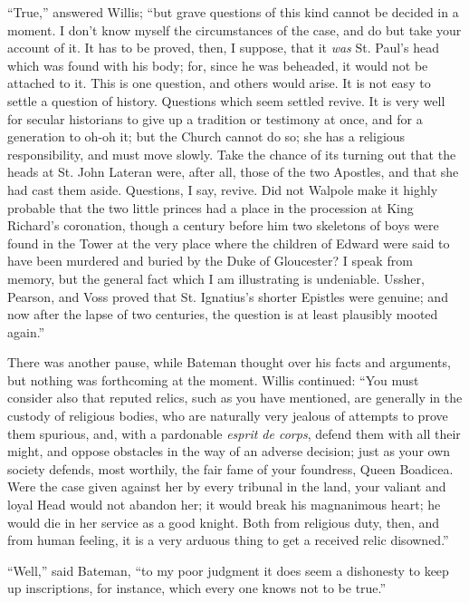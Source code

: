``True,'' answered Willis; ``but grave questions of
this kind cannot be decided in a moment. I don't know myself the
circumstances of the case, and do but take your account of it. It has
to be proved, then, I suppose, that it \emph{was} St. Paul's head
which was found with his body; for, since he was beheaded, it would
not be attached to it. This is one question, and others would arise.
It is not easy to settle a question of history. Questions which seem
settled revive. It is very well for secular historians to give up a
tradition or testimony at once, and for a generation to oh-oh it; but
the Church cannot do so; she has a religious responsibility, and must
move slowly. Take the chance of its turning out that the heads at St.
John Lateran were, after all, those of the two Apostles, and that she
had cast them aside. Questions, I say, revive. Did not Walpole make it
highly probable that the two little princes had a place in the
procession at King Richard's coronation, though a century before him
two skeletons of boys were found in the Tower at the very place where
the children of Edward were said to have been murdered and buried by
the Duke of Gloucester? I speak from memory, but the general fact
which I am illustrating is undeniable. Ussher, Pearson, and Voss
proved that St. Ignatius's shorter Epistles were genuine; and now
after the lapse of two centuries, the question is at least plausibly
mooted again.''

There was another pause, while Bateman thought over his facts and
arguments, but nothing was forthcoming at the moment. Willis
continued: ``You must consider also that reputed relics, such as
you have mentioned, are generally in the custody of religious bodies,
who are naturally very jealous of attempts to prove them spurious,
and, with a pardonable \emph{esprit de corps}, defend them with all
their might, and oppose obstacles in the way of an adverse decision;
just as your own society defends, most worthily, the fair fame of your
foundress, Queen Boadicea. Were the case given against her by every
tribunal in the land, your valiant and loyal Head would not abandon
her; it would break his magnanimous heart; he would die in her service
as a good knight. Both from religious duty, then, and from human
feeling, it is a very arduous thing to get a received relic
disowned.''

``Well,'' said Bateman, ``to my poor judgment it does
seem a dishonesty to keep up inscriptions, for instance, which every
one knows not to be true.''

